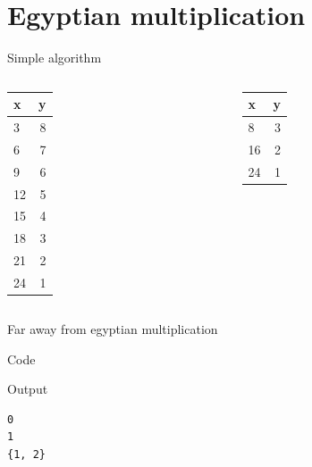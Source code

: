 \documentclass[10pt]{beamer}
\begin{document}
\section{Egyptian multiplication}

\begin{frame}{Simple algorithm}
  \begin{columns}
      \begin{table}
        \begin{tabular}{l|r}
          \toprule
          x & y\\
          \midrule
          3 & 8\\ \hline
          6 & 7\\ \hline
          9 & 6\\ \hline
          12 & 5\\ \hline
          15 & 4\\ \hline
          18 & 3\\ \hline
          21 & 2\\ \hline
          24 & 1\\ \hline
          \bottomrule
        \end{tabular}
      \end{table}

      \begin{table}
        \begin{tabular}{l|r}
          \toprule
          x & y\\
          \midrule
          8 & 3\\ \hline
          16  & 2\\ \hline
          24 & 1\\ \hline
          \bottomrule
        \end{tabular}
      \end{table}
  \end{columns}
\end{frame}


\begin{frame}[fragile]{Far away from egyptian multiplication}
\begin{block}{Code}
  
\end{block}
\begin{block}{Output}
\begin{lstlisting}
0
1
{1, 2}
\end{lstlisting}
\end{block}
\end{frame}
\end{document}
